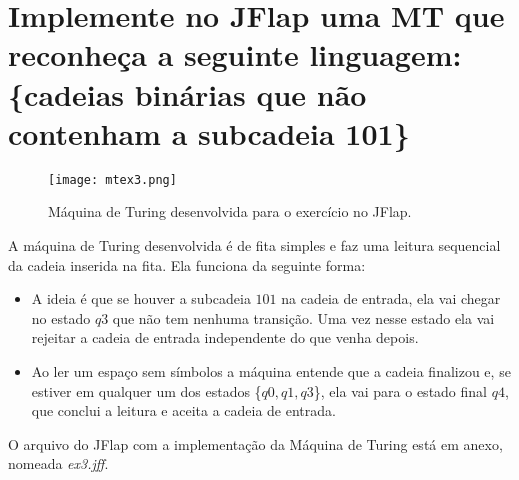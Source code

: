 \section{
    Implemente no JFlap uma MT que reconheça a seguinte linguagem: \{cadeias binárias que não contenham a subcadeia 101\}
    }

\setlength{\parindent}{4em}
\setlength{\parskip}{0.5em}
\renewcommand{\baselinestretch}{1}

\begin{figure}[h]
    \centering
    \texttt{[image: mtex3.png]}
    \caption{Máquina de Turing desenvolvida para o exercício no JFlap.}
    \label{fig:mtex3}
\end{figure}

A máquina de Turing desenvolvida é de fita simples e faz uma leitura sequencial da cadeia inserida na fita. Ela funciona da seguinte forma:
\begin{itemize}
    \item A ideia é que se houver a subcadeia \(101\) na cadeia de entrada, ela vai chegar no estado \(q3\) que não tem nenhuma transição. Uma vez nesse estado ela vai rejeitar a cadeia de entrada independente do que venha depois.

    \item  Ao ler um espaço sem símbolos a máquina entende que a cadeia finalizou e, se estiver em qualquer um dos estados \{\(q0, q1, q3\)\}, ela vai para o estado final \(q4\), que conclui a leitura e aceita a cadeia de entrada. 
\end{itemize}

O arquivo do JFlap com a implementação da Máquina de Turing está em anexo, nomeada \textit{ex3.jff}.
